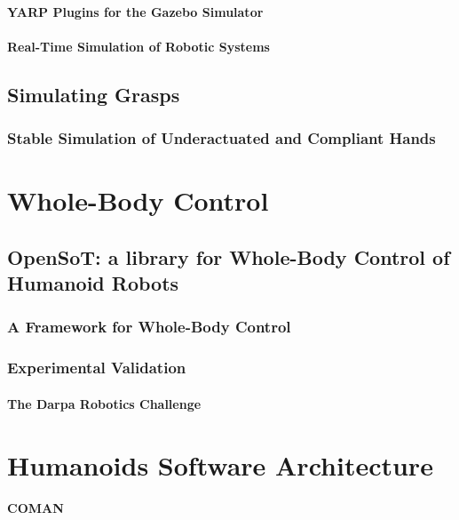 \documentclass[%
	paper=A4,					%
	twoside=true,				%
	openright,			.
	parskip=full,				%
	chapterprefix=true,			%
	11pt,						%
	headings=normal,			%
	bibliography=totoc,			%
	listof=totoc,				%
	titlepage=on,				%
	captions=tableabove,		%
	draft=false,				%
]{scrreprt}%
\begin{document}
\subsubsection{YARP Plugins for the Gazebo Simulator}
\subsubsection{Real-Time Simulation of Robotic Systems}

\section{Simulating Grasps}
\subsection{Stable Simulation of Underactuated and Compliant Hands}
\let\thefootnote\relax{}

\chapter{Whole-Body Control}

\let\thefootnote\relax{}
\section{OpenSoT: a library for Whole-Body Control of Humanoid Robots}
\subsection{A Framework for Whole-Body Control}
\subsection{Experimental Validation}
\subsubsection{The Darpa Robotics Challenge}

\chapter{Humanoids Software Architecture}

\subsubsection{COMAN}
\end{document}
